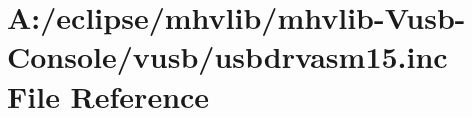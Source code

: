 \hypertarget{mhvlib-_vusb-_console_2vusb_2usbdrvasm15_8inc}{\section{A\-:/eclipse/mhvlib/mhvlib-\/\-Vusb-\/\-Console/vusb/usbdrvasm15.inc File Reference}
\label{mhvlib-_vusb-_console_2vusb_2usbdrvasm15_8inc}
}
